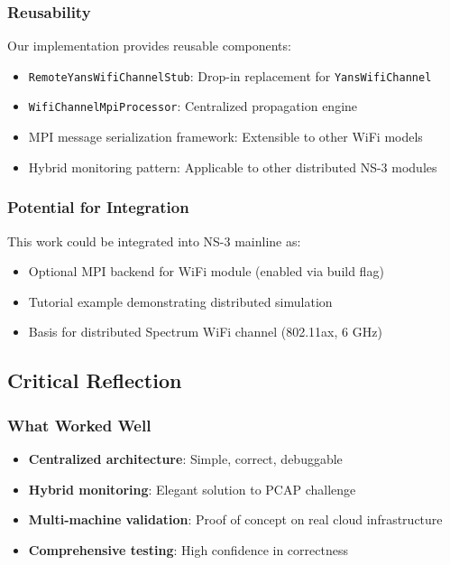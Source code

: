 \subsubsection{Reusability}

Our implementation provides reusable components:

\begin{itemize}
    \item \texttt{RemoteYansWifiChannelStub}: Drop-in replacement for \texttt{YansWifiChannel}
    \item \texttt{WifiChannelMpiProcessor}: Centralized propagation engine
    \item MPI message serialization framework: Extensible to other WiFi models
    \item Hybrid monitoring pattern: Applicable to other distributed NS-3 modules
\end{itemize}

\subsubsection{Potential for Integration}

This work could be integrated into NS-3 mainline as:
\begin{itemize}
    \item Optional MPI backend for WiFi module (enabled via build flag)
    \item Tutorial example demonstrating distributed simulation
    \item Basis for distributed Spectrum WiFi channel (802.11ax, 6 GHz)
\end{itemize}

\subsection{Critical Reflection}

\subsubsection{What Worked Well}

\begin{itemize}
    \item \textbf{Centralized architecture}: Simple, correct, debuggable
    \item \textbf{Hybrid monitoring}: Elegant solution to PCAP challenge
    \item \textbf{Multi-machine validation}: Proof of concept on real cloud infrastructure
    \item \textbf{Comprehensive testing}: High confidence in correctness
\end{itemize}

